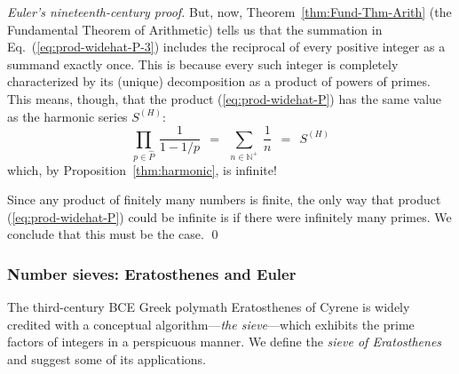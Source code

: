\begin{proof} [Euler's nineteenth-century proof]

But, now, Theorem~\ref{thm:Fund-Thm-Arith} (the Fundamental Theorem of Arithmetic) tells us that the summation in Eq.~(\ref{eq:prod-widehat-P-3}) includes the reciprocal of every positive integer as a summand exactly once. This is because every such integer is completely characterized by its (unique) decomposition as a product of powers of primes.  This means, though, that the product (\ref{eq:prod-widehat-P}) has the same value as the harmonic series $S^{(H)}$:
\[ \prod_{p \in \widehat{P}} \ \frac{1}{1-1/p} \ \ = \ \
\sum_{n \in \mathbb{N}^+} \ \frac{1}{n}  \ \ = \ \ S^{(H)} 
\]
which, by Proposition~\ref{thm:harmonic}, is infinite!

\smallskip

Since any product of finitely many numbers is finite, the only way that product 
(\ref{eq:prod-widehat-P}) could be infinite is if there were infinitely many primes.  We conclude that this must be the case.  \qed
\end{proof}


\subsubsection{Number sieves: Eratosthenes and Euler}
\label{sec:sieves}


The third-century BCE Greek polymath Eratosthenes of Cyrene is widely credited with a conceptual algorithm---{\it the sieve}---which exhibits the prime factors of integers in a perspicuous manner.  We define the {\it sieve of Eratosthenes} and suggest some of its applications.

